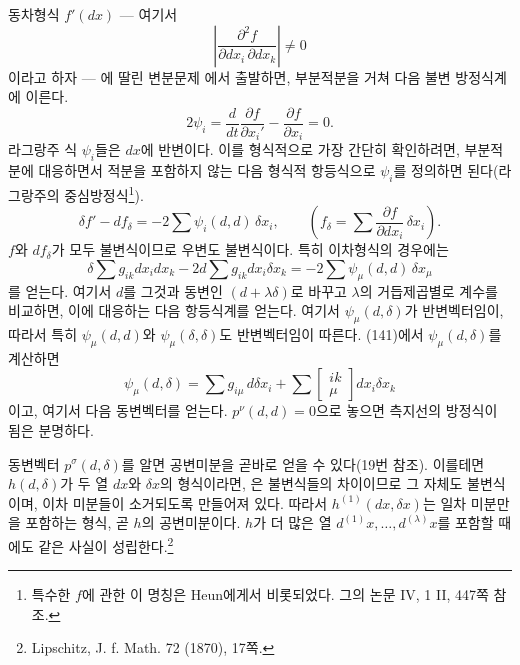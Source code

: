 동차형식 $f'(dx)$ --- 여기서
\[
\left|\frac{\partial^2 f}{\partial dx_i\,\partial dx_k}\right|\ne0
\]
이라고 하자 --- 에 딸린 변분문제
에서 출발하면, 부분적분을 거쳐 다음 불변 방정식계에 이른다.
\[
 2\psi_i=\frac{d}{dt}\frac{\partial f}{\partial x_i'}-\frac{\partial f}{\partial x_i}=0.
\]
라그랑주 식 $\psi_i$들은 $dx$에 반변이다. 이를 형식적으로 가장 간단히 확인하려면, 부분적분에 대응하면서 적분을 포함하지 않는 다음 형식적 항등식으로 $\psi_i$를 정의하면 된다(라그랑주의 중심방정식\footnote{특수한 $f$에 관한 이 명칭은 Heun에게서 비롯되었다. 그의 논문 IV, 1 II, 447쪽 참조.}).
\[
 \delta f'-df_\delta=-2\sum\psi_i(d,d)\,\delta x_i,
 \qquad
 \left(f_\delta=\sum\frac{\partial f}{\partial dx_i}\,\delta x_i\right).
\]
$f$와 $df_\delta$가 모두 불변식이므로 우변도 불변식이다. 특히 이차형식의 경우에는
\[
 \delta\sum g_{ik}dx_i dx_k-2d\sum g_{ik}dx_i\delta x_k
 =-2\sum\psi_\mu(d,d)\,\delta x_\mu
\]
를 얻는다. 여기서 $d$를 그것과 동변인 $(d+\lambda\delta)$로 바꾸고 $\lambda$의 거듭제곱별로 계수를 비교하면, 이에 대응하는 다음 항등식계를 얻는다.
여기서 $\psi_\mu(d,\delta)$가 반변벡터임이, 따라서 특히 $\psi_\mu(d,d)$와 $\psi_\mu(\delta,\delta)$도 반변벡터임이 따른다. (141)에서 $\psi_\mu(d,\delta)$를 계산하면
\[
 \psi_\mu(d,\delta)=\sum g_{i\mu}\,d\delta x_i+
 \sum\left[\begin{smallmatrix}ik\\ \mu\end{smallmatrix}\right]dx_i\delta x_k
\]
이고, 여기서 다음 동변벡터를 얻는다.
$p^\nu(d,d)=0$으로 놓으면 측지선의 방정식이 됨은 분명하다.

동변벡터 $p^\sigma(d,\delta)$를 알면 공변미분을 곧바로 얻을 수 있다(19번 참조). 이를테면 $h(d,\delta)$가 두 열 $dx$와 $\delta x$의 형식이라면,
은 불변식들의 차이이므로 그 자체도 불변식이며, 이차 미분들이 소거되도록 만들어져 있다. 따라서 $h^{(1)}(dx,\delta x)$는 일차 미분만을 포함하는 형식, 곧 $h$의 공변미분이다. $h$가 더 많은 열 $d^{(1)}x,\ldots,d^{(\lambda)}x$를 포함할 때에도 같은 사실이 성립한다.\footnote{Lipschitz, J. f. Math. 72 (1870), 17쪽.}

